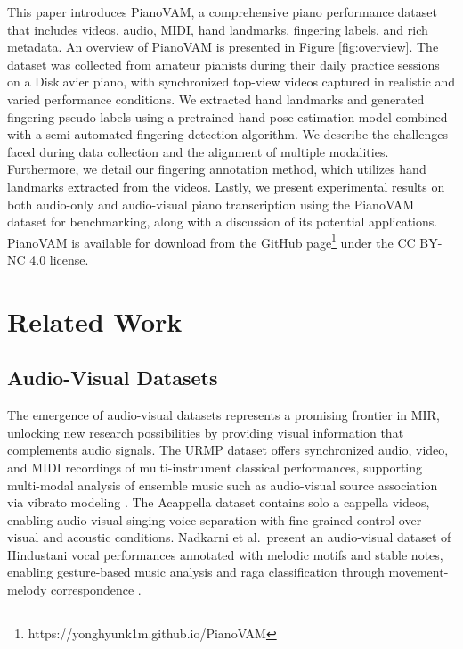 \documentclass{article}
\begin{document}
This paper introduces PianoVAM, a comprehensive piano performance dataset that includes videos, audio, MIDI, hand landmarks, fingering labels, and rich metadata. An overview of PianoVAM is presented in Figure \ref{fig:overview}. The dataset was collected from amateur pianists during their daily practice sessions on a Disklavier piano, with synchronized top-view videos captured in realistic and varied performance conditions. We extracted hand landmarks and generated fingering pseudo-labels using a pretrained hand pose estimation model combined with a semi-automated fingering detection algorithm.  We describe the challenges faced during data collection and the alignment of multiple modalities. Furthermore, we detail our fingering annotation method, which utilizes hand landmarks extracted from the videos. Lastly, we present experimental results on both audio-only and audio-visual piano transcription using the PianoVAM dataset for benchmarking, along with a discussion of its potential applications. PianoVAM is available for download from the GitHub page\footnote{https://yonghyunk1m.github.io/PianoVAM\label{github-link}} under the CC BY-NC 4.0 license.


\section{Related Work}
\subsection{Audio-Visual Datasets}
The emergence of audio-visual datasets represents a promising frontier in MIR, unlocking new research possibilities by providing visual information that complements audio signals. The URMP dataset \cite{TMM18Li} offers synchronized audio, video, and MIDI recordings of multi-instrument classical performances, supporting multi-modal analysis of ensemble music such as audio-visual source association via vibrato modeling \cite{SMC17Li}. The Acappella dataset \cite{BMVC21Montesinos} contains solo a cappella videos, enabling audio-visual singing voice separation with fine-grained control over visual and acoustic conditions. Nadkarni et al.\ present an audio-visual dataset of Hindustani vocal performances annotated with melodic motifs and stable notes, enabling gesture-based music analysis and raga classification through movement-melody correspondence \cite{TISMIR24Nadkarni}.
\end{document}
